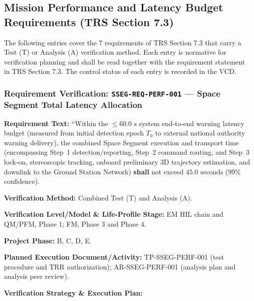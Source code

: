 \subsection{Mission Performance and Latency Budget Requirements (TRS Section 7.3)}
The following entries cover the 7 requirements of TRS Section 7.3 that carry a Test (T) or Analysis (A) verification method. Each entry is normative for verification planning and shall be read together with the requirement statement in TRS Section 7.3. The control status of each entry is recorded in the VCD.
\subsubsection{Requirement Verification: \texttt{SSEG-REQ-PERF-001} --- Space Segment Total Latency Allocation}
\label{ver:SSEG-REQ-PERF-001}
\textbf{Requirement Text:} ``Within the $\le 60.0\text{ s}$ system end-to-end warning latency budget (measured from initial  detection epoch $T_0$ to external national authority warning delivery), the combined Space Segment execution and transport time (encompassing Step~1  detection/reporting, Step~2  command routing, and Step~3  lock-on, stereoscopic tracking, onboard preliminary 3D trajectory estimation, and downlink to the Ground Station Network) \textbf{shall} not exceed $45.0\text{ seconds}$ ($99\%$ confidence).
\par\textbf{Verification Method:} Combined Test (T) and Analysis (A).
\par\textbf{Verification Level/Model \& Life-Profile Stage:} EM HIL chain and QM/PFM, Phase 1; FM, Phase 3 and Phase 4.
\par\textbf{Project Phase:} B, C, D, E.
\par\textbf{Planned Execution Document/Activity:} TP-SSEG-PERF-001 (test procedure and TRR authorization); AR-SSEG-PERF-001 (analysis plan and analysis peer review).
\par\textbf{Verification Strategy \& Execution Plan:}
